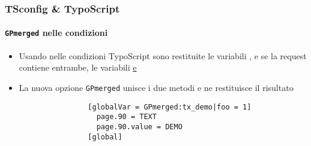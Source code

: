 
\begin{frame}[fragile]
	\frametitle{TSconfig \& TypoScript}
	\framesubtitle{\texttt{GPmerged} nelle condizioni}

	\begin{itemize}

		\item Usando  nelle condizioni TypoScript sono restituite le variabili ,
			e se la request contiene entrambe, le variabili  \underline{e}

		\item La nuova opzione \texttt{GPmerged} unisce i due metodi e ne restituisce il risultato

			\begin{lstlisting}
				[globalVar = GPmerged:tx_demo|foo = 1]
				  page.90 = TEXT
				  page.90.value = DEMO
				[global]
			\end{lstlisting}

	\end{itemize}

\end{frame}



